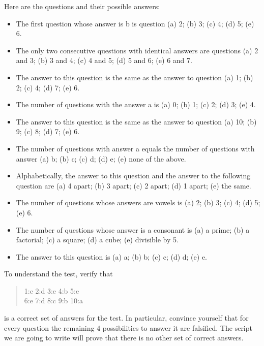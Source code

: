 \documentclass[a4paper,halfparskip]{scrartcl}
\begin{document}
Here are the questions and their possible answers:
\begin{itemize}
\item
The first question whose answer is b is question 
(a) 2; (b) 3; (c) 4; (d) 5; (e) 6.
\item
The only two consecutive questions with identical answers are questions 
(a) 2 and 3; (b) 3 and 4; (c) 4 and 5; (d) 5 and 6; (e) 6 and 7.
\item
The answer to this question is the same as the answer to question 
(a) 1; (b) 2; (c) 4; (d) 7; (e) 6.
\item
The number of questions with the answer a is (a) 0; (b) 1; (c) 2; (d) 3; (e) 4.
\item
The answer to this question is the same as the answer to question 
(a) 10; (b) 9; (c) 8; (d) 7; (e) 6.
\item
The number of questions with answer a equals the number of questions 
with answer (a) b; (b) c; (c) d; (d) e; (e) none of the above.
\item
Alphabetically, the answer to this question and the answer to the 
following question are (a) 4 apart; (b) 3 apart; (c) 2 apart; 
(d) 1 apart; (e) the same.
\item
The number of questions whose answers are vowels is (a) 2; (b) 3; 
(c) 4; (d) 5; (e) 6.
\item
The number of questions whose answer is a consonant is (a) a prime; 
(b) a factorial; (c) a square; (d) a cube; (e) divisible by 5.
\item
The answer to this question is (a) a; (b) b; (c) c; (d) d; (e) e.
\end{itemize}
To understand the test, verify that
\begin{quote}
1:c  \hspace{2mm} 2:d \hspace{2mm} 3:e \hspace{2mm} 4:b \hspace{2mm}5:e\\
6:e \hspace{2mm} 7:d \hspace{2mm} 8:c \hspace{2mm} 9:b \hspace{2mm} 10:a
\end{quote}
is a correct set of answers for the test. In particular, convince 
yourself that for every question the remaining 4 possibilities to 
answer it are falsified. The script we are going to write will 
prove that there is no other set of correct answers.
\end{document}
